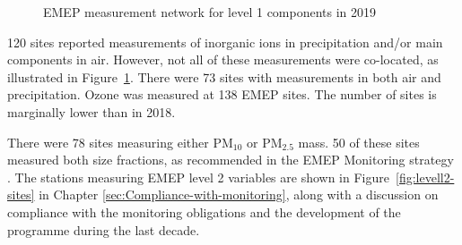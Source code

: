 \begin{figure}[h!]
 \centering
\caption{\label{fig:EMEP-measurement-network}EMEP measurement network for level 1 components in 2019}
\end{figure}

120 sites reported measurements of inorganic ions in precipitation and/or main components in air. However, not all of these measurements were co-located, as illustrated in Figure~\ref{fig:EMEP-measurement-network}. There were 73 sites with measurements in both air and precipitation.  Ozone was measured at 138 EMEP sites. The number of sites is marginally lower than in 2018.

There were 78 sites measuring either PM$_{10}$ or PM$_{2.5}$ mass. 50 of these sites measured both size fractions, as recommended in the EMEP Monitoring strategy \citep{MonStrat2019}. The stations measuring EMEP level 2 variables are shown in Figure~\ref{fig:levell2-sites} in Chapter \ref{sec:Compliance-with-monitoring}, along with a discussion on compliance with the monitoring obligations and the development of the programme during the last decade.


